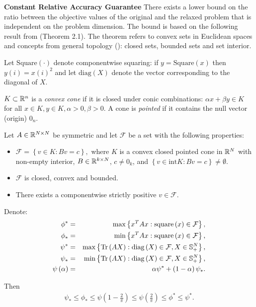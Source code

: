 \noindent\textbf{Constant Relative Accuracy Guarantee}
There exists a lower bound on the ratio between the objective values of the original
and the relaxed problem that is independent on the problem dimension. The bound is
based on the following result from \cite{Nesterov98globalquadratic} (Theorem 2.1).
The theorem refers to convex sets in Euclidean spaces \cite{Boyd:2004:CO:993483} and
concepts from general topology (\cite{bourbaki1998general}): closed sets,
bounded sets and set interior.
\begin{notation}
Let $\mathrm{Square}(\cdot)$ denote componentwise squaring: if
$y = \mathrm{Square}(x)$ then $y(i) = x(i)^2$ and let $\mathrm{diag}(X)$
denote the vector corresponding to the diagonal of $X$.
\end{notation}
\begin{definition}
$K \subset \mathbb{R}^n$ is a \emph{convex cone} if it is closed under conic combinations:
$\alpha x + \beta y \in K$ for all $x \in K, y \in K, \alpha > 0, \beta > 0$.
A cone is \emph{pointed} if it contains the null vector (origin) $0_n$.
\end{definition}

\begin{theorem}\label{thm:nesterov}
Let $A \in \mathbb{R}^{N \times N}$ be symmetric and let $\mathcal{F}$ be a set with the following properties:
\begin{itemize}
\item $\mathcal{F} = \left\{ v \in K: B v = c  \right\},$ where $K$ is a convex closed pointed
cone in $\mathbb{R}^N$ with non-empty interior, $B \in \mathbb{R}^{k\times N}$, $c \neq 0_k$, and
$\left\{  v \in \mathrm{int}K : B v = c \right\} \neq \emptyset$.
\item $\mathcal{F}$ is closed, convex and bounded.
\item There exists a componentwise strictly positive $v \in \mathcal{F}$.

\end{itemize}
Denote:
\begin{align*}
\phi^* &=& \mathrm{max}\left\{  x^T A x : \mathrm{square}\left(x\right) \in \mathcal{F}  \right\},\\
\phi_* &=& \mathrm{min}\left\{  x^T A x : \mathrm{square}\left(x\right) \in \mathcal{F}  \right\},\\
\psi^* &=& \mathrm{max}\left\{  \mathrm{Tr}\left(A X\right): \mathrm{diag}\left(X\right) \in \mathcal{F}, X \in \mathbb{S}_+^N  \right\},\\
\psi_* &=& \mathrm{min}\left\{  \mathrm{Tr}\left(A X\right): \mathrm{diag}\left(X\right) \in \mathcal{F}, X \in \mathbb{S}_+^N  \right\},\\
\psi \left(\alpha\right) &=& \alpha \psi^* + \left(1-\alpha\right)\psi_*.
\end{align*}

Then
\begin{equation}\label{eq:sdpBound}
\begin{aligned}
\psi_* \leq \phi_* \leq \psi \left(1 - \frac{2}{\pi}\right) \leq \psi\left(\frac{2}{\pi}\right) \leq \phi^* \leq \psi^*.
\end{aligned}
\end{equation}
\end{theorem}


